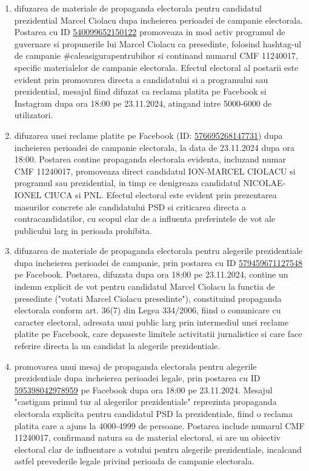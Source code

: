 \documentclass[a4paper,12pt]{article}
\begin{document}
\begin{enumerate}[leftmargin=*, label=\arabic*.)]
    \item difuzarea de materiale de propaganda electorala pentru candidatul prezidential Marcel Ciolacu dupa incheierea perioadei de campanie electorala. Postarea cu ID \href{https://www.facebook.com/ads/library/?id=540099652150122}{540099652150122} promoveaza in mod activ programul de guvernare si propunerile lui Marcel Ciolacu ca presedinte, folosind hashtag-ul de campanie \#caleasigurapentrubihor si continand numarul CMF 11240017, specific materialelor de campanie electorala. Efectul electoral al postarii este evident prin promovarea directa a candidatului si a programului sau prezidential, mesajul fiind difuzat ca reclama platita pe Facebook si Instagram dupa ora 18:00 pe 23.11.2024, atingand intre 5000-6000 de utilizatori.
    \item difuzarea unei reclame platite pe Facebook (ID: \href{https://www.facebook.com/ads/library/?id=576695268147731}{576695268147731}) dupa incheierea perioadei de campanie electorala, la data de 23.11.2024 dupa ora 18:00. Postarea contine propaganda electorala evidenta, incluzand numar CMF 11240017, promoveaza direct candidatul ION-MARCEL CIOLACU si programul sau prezidential, in timp ce denigreaza candidatul NICOLAE-IONEL CIUCA si PNL. Efectul electoral este evident prin prezentarea masurilor concrete ale candidatului PSD si criticarea directa a contracandidatilor, cu scopul clar de a influenta preferintele de vot ale publicului larg in perioada prohibita.
    \item difuzarea de materiale de propaganda electorala pentru alegerile prezidentiale dupa incheierea perioadei de campanie, prin postarea cu ID \href{https://www.facebook.com/ads/library/?id=579459671127548}{579459671127548} pe Facebook. Postarea, difuzata dupa ora 18:00 pe 23.11.2024, contine un indemn explicit de vot pentru candidatul Marcel Ciolacu la functia de presedinte ("votati Marcel Ciolacu presedinte"), constituind propaganda electorala conform art. 36(7) din Legea 334/2006, fiind o comunicare cu caracter electoral, adresata unui public larg prin intermediul unei reclame platite pe Facebook, care depaseste limitele activitatii jurnalistice si care face referire directa la un candidat la alegerile prezidentiale.
    \item promovarea unui mesaj de propaganda electorala pentru alegerile prezidentiale dupa incheierea perioadei legale, prin postarea cu ID \href{https://www.facebook.com/ads/library/?id=595398042978959}{595398042978959} pe Facebook dupa ora 18:00 pe 23.11.2024. Mesajul "castigam primul tur al alegerilor prezidentiale" reprezinta propaganda electorala explicita pentru candidatul PSD la prezidentiale, fiind o reclama platita care a ajuns la 4000-4999 de persoane. Postarea include numarul CMF 11240017, confirmand natura sa de material electoral, si are un obiectiv electoral clar de influentare a votului pentru alegerile prezidentiale, incalcand astfel prevederile legale privind perioada de campanie electorala.

\end{enumerate}
\end{document}
